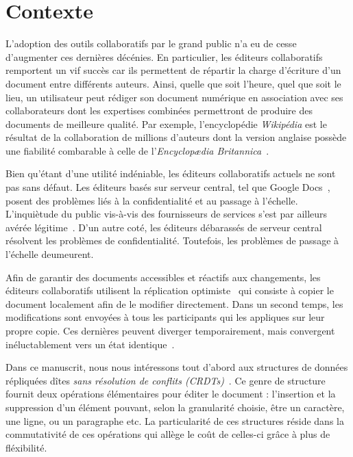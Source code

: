 
\section{Contexte}

L'adoption des outils collaboratifs par le grand public n'a eu de cesse
d'augmenter ces dernières décénies. En particulier, les éditeurs
collaboratifs~\cite{ellis1991groupware} remportent un vif succès car ils
permettent de répartir la charge d'écriture d'un document entre différents
auteurs. Ainsi, quelle que soit l'heure, quel que soit le lieu, un utilisateur
peut rédiger son document numérique en association avec ses collaborateurs dont
les expertises combinées permettront de produire des documents de meilleure
qualité. Par exemple, l'encyclopédie \emph{Wikipédia} est le résultat de la
collaboration de millions d'auteurs dont la version anglaise possède une
fiabilité combarable à celle de l'\emph{Encyclop\ae{}dia
Britannica}~\cite{giles2005internet}.

Bien qu'étant d'une utilité indéniable, les éditeurs collaboratifs actuels ne
sont pas sans défaut. Les éditeurs basés sur serveur central, tel que Google
Docs~\cite{nichols1995high}, posent des problèmes liés à la confidentialité et
au passage à l'échelle. L'inquiètude du public vis-à-vis des fournisseurs de
services s'est par ailleurs avérée légitime~\cite{gellman2013us}. D'un autre
coté, les éditeurs débarassés de serveur central résolvent les problèmes de
confidentialité. Toutefois, les problèmes de passage à l'échelle deumeurent.


Afin de garantir des documents accessibles et réactifs aux changements, les
éditeurs collaboratifs utilisent la réplication
optimiste~\cite{saito2005optimistic} qui consiste à copier le document
localement afin de le modifier directement. Dans un second temps, les
modifications sont envoyées à tous les participants qui les appliques sur leur
propre copie.  Ces dernières peuvent diverger temporairement, mais convergent
inéluctablement vers un état identique~\cite{bailis2013eventual}.

Dans ce manuscrit, nous nous intéressons tout d'abord aux structures de données
répliquées dîtes \emph{sans résolution de conflits
(CRDTs)}~\cite{shapiro2011comprehensive, shapiro2011conflict}. Ce genre de
structure~\cite{ahmed2011evaluating, andre2013supporting, conway2014language,
grishchenko2010deep, oster2006data, preguica2009commutative, roh2011replicated,
weiss2007wooki, weiss2009logoot, wu2010partial, yu2012stringwise} fournit deux
opérations élémentaires pour éditer le document : l'insertion et la suppression
d'un élément pouvant, selon la granularité choisie, être un caractère, une
ligne, ou un paragraphe etc. La particularité de ces structures réside dans la
commutativité de ces opérations qui allège le coût de celles-ci grâce à plus de
fléxibilité.

